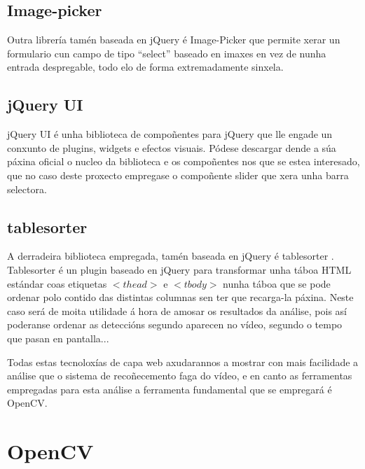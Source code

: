         \subsection{Image-picker}
        
            Outra librería tamén baseada en jQuery é Image-Picker \cite{ImagePickerPage} que permite
            xerar un formulario cun campo de tipo ``select'' baseado en imaxes en vez de nunha 
            entrada despregable, todo elo de forma extremadamente sinxela.
        
        \subsection{jQuery UI}
        
            jQuery UI é unha biblioteca de compoñentes para jQuery que lle engade un conxunto de 
            plugins, widgets e efectos visuais. Pódese descargar dende a súa páxina oficial o 
            nucleo da biblioteca e os compoñentes nos que se estea interesado, que no caso deste
            proxecto  empregase o compoñente slider\cite{ComponenteSliderJqueryUi} que
            xera unha barra selectora.
        
        \subsection{tablesorter}
        
            A derradeira biblioteca empregada, tamén baseada en jQuery é tablesorter
            \cite{tablesorter-webPage}. Tablesorter é un plugin baseado en jQuery para transformar 
            unha táboa HTML estándar coas etiquetas $<thead>$ e $<tbody>$ nunha táboa que se pode 
            ordenar polo contido das distintas columnas sen ter que recarga-la páxina. Neste
            caso será de moita utilidade á hora de amosar os resultados da análise, pois así 
            poderanse ordenar as deteccións segundo aparecen no vídeo, segundo o tempo que pasan 
            en pantalla... 
        
    Todas estas tecnoloxías de capa web axudarannos a mostrar con mais facilidade a análise que o
    sistema de recoñecemento faga do vídeo, e en canto as ferramentas empregadas para esta análise
    a ferramenta fundamental que se empregará é OpenCV.
    
\section{OpenCV}
    
